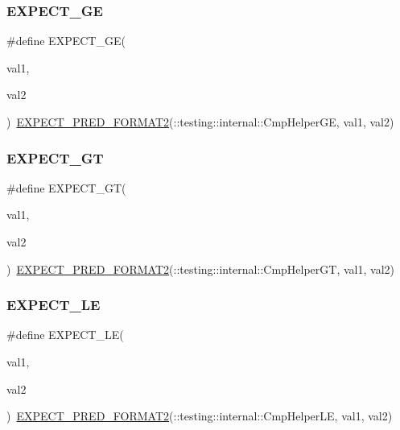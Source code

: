 \subsubsection{\texorpdfstring{EXPECT\_GE}{EXPECT\_GE}}
{\footnotesize\ttfamily \#define E\+X\+P\+E\+C\+T\+\_\+\+GE(\begin{DoxyParamCaption}\item[{}]{val1,  }\item[{}]{val2 }\end{DoxyParamCaption})~\mbox{\hyperlink{_obj__test_2lib_2googletest-release-1_88_81_2googletest_2include_2gtest_2gtest__pred__impl_8h_af0141918615a5e2d5247e9cda8324dae}{E\+X\+P\+E\+C\+T\+\_\+\+P\+R\+E\+D\+\_\+\+F\+O\+R\+M\+A\+T2}}(\+::testing\+::internal\+::\+Cmp\+Helper\+GE, val1, val2)}

\mbox{\label{googletest-master_2googletest_2include_2gtest_2gtest_8h_aa8bc8320813e1abb0016129b636e3b27}} 
\subsubsection{\texorpdfstring{EXPECT\_GT}{EXPECT\_GT}}
{\footnotesize\ttfamily \#define E\+X\+P\+E\+C\+T\+\_\+\+GT(\begin{DoxyParamCaption}\item[{}]{val1,  }\item[{}]{val2 }\end{DoxyParamCaption})~\mbox{\hyperlink{_obj__test_2lib_2googletest-release-1_88_81_2googletest_2include_2gtest_2gtest__pred__impl_8h_af0141918615a5e2d5247e9cda8324dae}{E\+X\+P\+E\+C\+T\+\_\+\+P\+R\+E\+D\+\_\+\+F\+O\+R\+M\+A\+T2}}(\+::testing\+::internal\+::\+Cmp\+Helper\+GT, val1, val2)}

\mbox{\label{googletest-master_2googletest_2include_2gtest_2gtest_8h_ae0f265632323b4a07b585dcfde10f60a}} 
\subsubsection{\texorpdfstring{EXPECT\_LE}{EXPECT\_LE}}
{\footnotesize\ttfamily \#define E\+X\+P\+E\+C\+T\+\_\+\+LE(\begin{DoxyParamCaption}\item[{}]{val1,  }\item[{}]{val2 }\end{DoxyParamCaption})~\mbox{\hyperlink{_obj__test_2lib_2googletest-release-1_88_81_2googletest_2include_2gtest_2gtest__pred__impl_8h_af0141918615a5e2d5247e9cda8324dae}{E\+X\+P\+E\+C\+T\+\_\+\+P\+R\+E\+D\+\_\+\+F\+O\+R\+M\+A\+T2}}(\+::testing\+::internal\+::\+Cmp\+Helper\+LE, val1, val2)}

